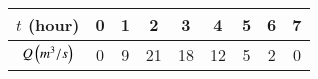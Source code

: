 \begin{tabular}{|c|c|c|c|c|c|c|c|c|}
\hline
$t$ (hour) & 0 & 1 & 2 & 3 & 4 & 5 & 6 & 7 \\ \hline
$Q \left(m^3/s\right)$ & 0 & 9 & 21 & 18 & 12 & 5 & 2 & 0 \\ \hline
\end{tabular}